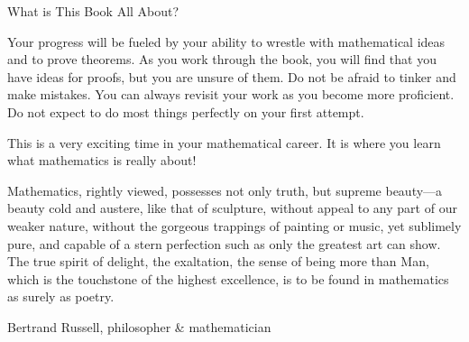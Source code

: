 \begin{section}{What is This Book All About?}

Your progress will be fueled by your ability to wrestle with mathematical ideas and to prove theorems.  As you work through the book, you will find that you have ideas for proofs, but you are unsure of them.  Do not be afraid to tinker and make mistakes.  You can always revisit your work as you become more proficient. Do not expect to do most things perfectly on your first attempt. 


This is a very exciting time in your mathematical career.  It is where you learn what mathematics is really about!

\epigraph{Mathematics, rightly viewed, possesses not only truth, but supreme beauty---a beauty cold and austere, like that of sculpture, without appeal to any part of our weaker nature, without the gorgeous trappings of painting or music, yet sublimely pure, and capable of a stern perfection such as only the greatest art can show. The true spirit of delight, the exaltation, the sense of being more than Man, which is the touchstone of the highest excellence, is to be found in mathematics as surely as poetry.}{Bertrand Russell, philosopher \& mathematician}

\end{section}

